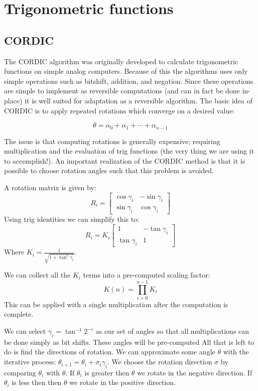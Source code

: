 \section{Trigonometric functions}
    \subsection{CORDIC}

	The CORDIC\cite{V:1959} algorithm was originally developed to calculate
	trigonometric functions on simple analog computers. Because of this the
	algorithms uses only simple operations such as bitshift, addition, and
	negation. Since these operations are simple to implement as reversible
	computations (and can in fact be done in-place) it is well suited for
	adaptation as a reversible algorithm. The basic idea of CORDIC is to
	apply repeated rotations which converge on a desired value:

        \[ \theta = \alpha_0 + \alpha_1 + \dotsb + \alpha_{n-1} \]

	The issue is that computing rotations is generally expensive; requiring
	multiplication and the evaluation of trig functions (the very thing we
	are using it to accomplish!). An important realization of the CORDIC
	method is that it is possible to choose rotation angles such that this
	problem is avoided.

        A rotation matrix is given by:
        \[
          R_i = \begin{bmatrix}
            \cos\gamma_i & -\sin\gamma_i \\
            \sin\gamma_i & \cos\gamma_i
          \end{bmatrix}
        \]
        Using trig identities we can simplify this to:
        \[
          R_i = K_i
                \begin{bmatrix}
                  1            & -\tan\gamma_i \\
                  \tan\gamma_i & 1
                \end{bmatrix}
        \]
        Where $K_i = \frac{1}{\sqrt{1+\tan^2\gamma_i}}$.

        We can collect all the $K_i$ terms into a pre-computed scaling factor:
        \[ K(n) = \prod_{i=0}^{n-1}K_i \]
        This can be applied with a single multiplication after the computation is complete.

        We can select $\gamma_i = \tan^{-1}2^{-i}$ as our set of angles so that all multiplications can be done simply as bit shifts.
        These angles will be pre-computed
        All that is left to do is find the directions of rotation.
        We can approximate some angle $\theta$ with the iterative process: $\theta_{i+1} = \theta_i + \sigma_i\gamma_i$.
        We choose the rotation direction $\sigma$ by comparing $\theta_i$ with $\theta$.
        If $\theta_i$ is greater then $\theta$ we rotate in the negative direction.
        If $\theta_i$ is less then then $\theta$ we rotate in the positive direction.

